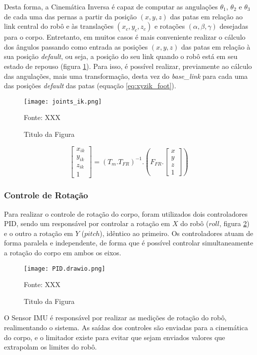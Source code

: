 \documentclass[../main.tex]{subfiles}
\begin{document}
  Desta forma, a Cinemática Inversa é capaz de computar as angulações  $\theta_1$, $\theta_2$ e $\theta_3$ de cada uma das pernas a partir da posição $(x, y, z)$ das patas em relação ao link central do robô e às translações $(x_c, y_c, z_c)$ e rotações $(\alpha, \beta, \gamma)$ desejadas para o corpo. Entretanto, em muitos casos é mais conveniente realizar o cálculo dos ângulos passando como entrada as posições $(x, y, z)$ das patas em relação à sua posição \textit{default}, ou seja, a posição do seu link quando o robô está em seu estado de repouso (figura \ref{fig:joints_ik}). Para isso, é possível realizar, previamente ao cálculo das angulações, mais uma transformação, desta vez do \textit{base\_link} para cada uma das posições \textit{default} das patas (equação \ref{eq:xyzik_foot}).

  \begin{figure}[h]
    \centering
    \caption{Titulo da Figura}
    \texttt{[image: joints\_ik.png]}
    
    Fonte: XXX
    \label{fig:joints_ik}
  \end{figure}


  \begin{equation}
    \label{eq:xyzik_foot}
    \begin{bmatrix}
    x_{ik} \\
    y_{ik} \\
    z_{ik} \\
    1
    \end{bmatrix}= (T_m.T_{FR})^{-1}.
    (F_{FR}.
    \begin{bmatrix}
    x \\
    y \\
    z \\
    1
    \end{bmatrix})
  \end{equation}

  \subsubsection{Controle de Rotação}

  Para realizar o controle de rotação do corpo, foram utilizados dois controladores PID, sendo um responsável por controlar a rotação em $X$ do robô ($roll$, figura \ref{fig:pid}) e o outro a rotação em $Y$ ($pitch$), idêntico ao primeiro. Os controladores atuam de forma paralela e independente, de forma que é possível controlar simultaneamente a rotação do corpo em ambos os eixos.

  \begin{figure}[h]
    \centering
    \caption{Titulo da Figura}
    \texttt{[image: PID.drawio.png]}
    
    Fonte: XXX
    \label{fig:pid}
  \end{figure}

  O Sensor IMU é responsável por realizar as medições de rotação do robô, realimentando o sistema. As saídas dos controles são enviadas para a cinemática do corpo, e o limitador existe para evitar que sejam enviados valores que extrapolam os limites do robô.  
  
\end{document}
